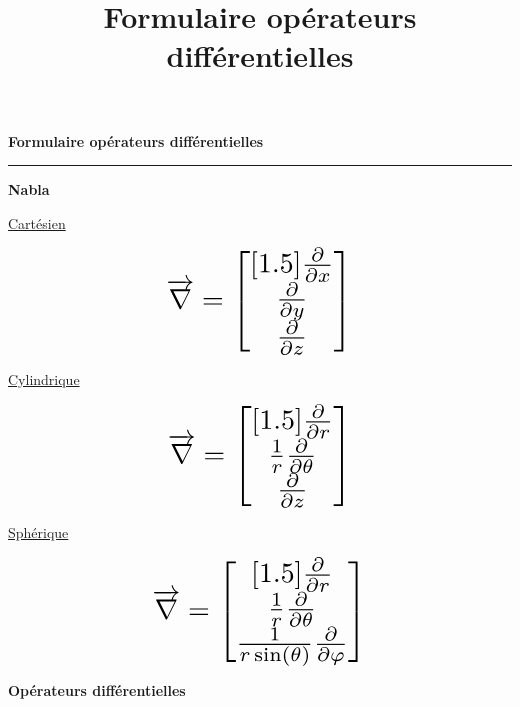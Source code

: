 \documentclass{article}
\title{Formulaire opérateurs différentielles}
\newcommand{\vtab} {\vspace{0.4cm}}
\begin{document}
\begin{center}
	\vspace{.4cm}
	{\textbf{\Huge Formulaire opérateurs différentielles}}
	\vspace{0.5cm}
  \hrule
\end{center}

\vtab
\vtab

\begin{center}
{\huge \textbf{Nabla }}
\end{center}

\vtab

\begin{center}
\begin{multicols}{3}
		{\Large \underline{Cartésien}} \\
\vtab

			$$\scalebox{2}{$\displaystyle \overrightarrow{\nabla} = \begin{bmatrix}[1.5] \frac{\partial}{\partial x} \\ \frac{\partial}{\partial y} \\ \frac{\partial}{\partial z} \end{bmatrix}$}$$

	\columnbreak
		{\Large \underline{Cylindrique}} \\

\vtab

			$$\scalebox{2}{$\displaystyle \overrightarrow{\nabla} = \begin{bmatrix}[1.5] \frac{\partial}{\partial r} \\ \frac{1}{r}\frac{\partial}{\partial \theta} \\ \frac{\partial}{\partial z} \end{bmatrix}$}$$

	
	\columnbreak
		{\Large \underline{Sphérique}} \\

\vtab

			$$\scalebox{2}{$\displaystyle \overrightarrow{\nabla} = \begin{bmatrix}[1.5] \frac{\partial}{\partial r} \\ \frac{1}{r}\frac{\partial}{\partial \theta} \\ \frac{1}{r \sin (\theta)} \frac{\partial}{\partial \varphi} \end{bmatrix}$}$$
\end{multicols}
\end{center}

\vtab
\vtab

\begin{center}
	{\huge \textbf{Opérateurs différentielles}}
\end{center}
\end{document}
